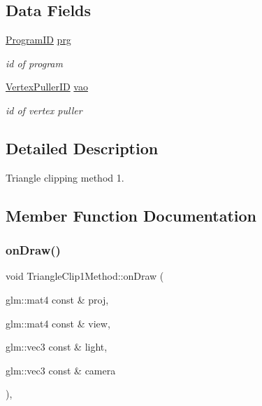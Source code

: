 \subsection*{Data Fields}
\begin{DoxyCompactItemize}
\item 
\mbox{\label{classTriangleClip1Method_aeede025939f3728ae3fd9ef40e42005e}} 
\hyperlink{fwd_8hpp_a46ffd067c21ab50f5f1fcfed5d8bfc15}{Program\+ID} \hyperlink{classTriangleClip1Method_aeede025939f3728ae3fd9ef40e42005e}{prg}
\begin{DoxyCompactList}\small\item\em id of program \end{DoxyCompactList}\item 
\mbox{\label{classTriangleClip1Method_a9318f0a9370e44f4c97d38ad583cc3fa}} 
\hyperlink{fwd_8hpp_af6f78f73099477c9ce5537d657597486}{Vertex\+Puller\+ID} \hyperlink{classTriangleClip1Method_a9318f0a9370e44f4c97d38ad583cc3fa}{vao}
\begin{DoxyCompactList}\small\item\em id of vertex puller \end{DoxyCompactList}\end{DoxyCompactItemize}


\subsection{Detailed Description}
Triangle clipping method 1. 

\subsection{Member Function Documentation}
\mbox{\label{classTriangleClip1Method_a5761d061239fbd8afa2e8c29cc3bef04}} 
\subsubsection{\texorpdfstring{on\+Draw()}{onDraw()}}
{\footnotesize\ttfamily void Triangle\+Clip1\+Method\+::on\+Draw (\begin{DoxyParamCaption}\item[{glm\+::mat4 const \&}]{proj,  }\item[{glm\+::mat4 const \&}]{view,  }\item[{glm\+::vec3 const \&}]{light,  }\item[{glm\+::vec3 const \&}]{camera }\end{DoxyParamCaption})\hspace{0.3cm}{\ttfamily [override]}, {\ttfamily [virtual]}}



